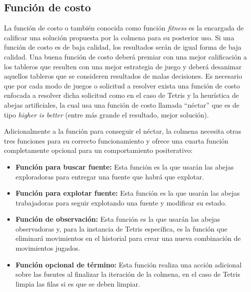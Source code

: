 

\subsection{Función de costo}

La función de costo o también conocida como función \textit{fitness} es la encargada 
de calificar una solución propuesta por la colmena para su posterior uso. 
Si una función de costo es de baja calidad, los resultados serán de igual forma 
de baja calidad. Una buena función de costo deberá premiar con una mejor 
calificación a los tableros que resulten con una mejor estrategia de juego y 
deberá desanimar aquellos tableros que se consideren resultados de malas decisiones. Es 
necesario que por cada modo de juegos o solicitud a resolver exista una función 
de costo enfocada a resolver dicha solicitud como en el caso de Tetris y la 
heurística de abejas artificiales, la cual usa una función de costo llamada 
``néctar'' que es de tipo \textit{higher is better} (entre más grande el 
resultado, mejor solución).

Adicionalmente a la función para conseguir el néctar, la colmena necesita 
otras tres funciones para su correcto funcionamiento y ofrece una cuarta 
función completamente opcional para un comportamiento positerativo: %

\begin{itemize}
\item\textbf{Función para buscar fuente:} Esta función es la que usarán 
las abejas exploradoras para entregar una fuente que habrá que explotar.

\item\textbf{Función para explotar fuente:} Esta función es la que usarán 
las abejas trabajadoras para seguir explotando una fuente y modificar su estado.

\item\textbf{Función de observación:} Esta función es la que usarán 
las abejas observadoras y, para la instancia de Tetris específica, es la 
función que eliminará movimientos en el historial para crear una nueva 
combinación de movimientos jugados.

\item\textbf{Función opcional de término:} Esta función realiza una acción adicional 
sobre las fuentes al finalizar la iteración de la colmena, en el caso de Tetris 
limpia las filas si es que se deben limpiar.
\end{itemize}

